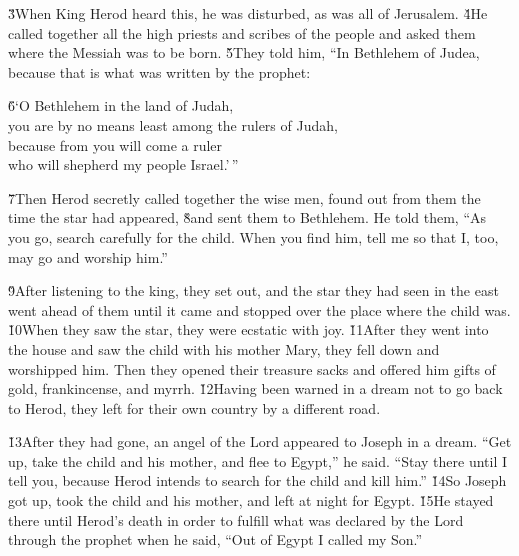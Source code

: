 \v{3}When King Herod heard this, he was disturbed, as was all of Jerusalem. \v{4}He called together all the high priests and scribes of the people and asked them where the Messiah was to be born. \v{5}They told him, ``In Bethlehem of Judea, because that is what was written by the prophet:

\begin{poetry}
\poeml \v{6}`O Bethlehem in the land of Judah, \\
\poemll    you are by no means least among the rulers of Judah, \\
\poeml because from you will come a ruler \\
\poemll    who will shepherd my people Israel.'\,''
\end{poetry}

\v{7}Then Herod secretly called together the wise men, found out from them the time the star had appeared, \v{8}and sent them to Bethlehem. He told them, ``As you go, search carefully for the child. When you find him, tell me so that I, too, may go and worship him.''

\v{9}After listening to the king, they set out, and the star they had seen in the east went ahead of them until it came and stopped over the place where the child was. \v{10}When they saw the star, they were ecstatic with joy. \v{11}After they went into the house and saw the child with his mother Mary, they fell down and worshipped him. Then they opened their treasure sacks and offered him gifts of gold, frankincense, and myrrh. \v{12}Having been warned in a dream not to go back to Herod, they left for their own country by a different road.

\v{13}After they had gone, an angel of the Lord appeared to Joseph in a dream. ``Get up, take the child and his mother, and flee to Egypt,'' he said. ``Stay there until I tell you, because Herod intends to search for the child and kill him.'' \v{14}So Joseph got up, took the child and his mother, and left at night for Egypt. \v{15}He stayed there until Herod's death in order to fulfill what was declared by the Lord through the prophet when he said, ``Out of Egypt I called my Son.''

